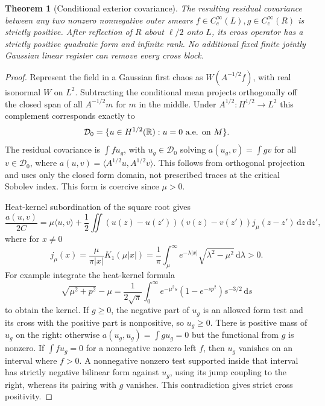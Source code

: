 \documentclass[11pt]{article}
\newtheorem{theorem}{Theorem}
\newcommand{\dd}{\mathrm d}
\begin{document}
\begin{theorem}[Conditional exterior covariance]
The resulting residual covariance between any two nonzero nonnegative outer smears \(f\in C_c^\infty(L),g\in C_c^\infty(R)\) is strictly positive. After reflection of \(R\) about \(\ell/2\) onto \(L\), its cross operator has a strictly positive quadratic form and infinite rank. No additional fixed finite jointly Gaussian linear register can remove every cross block.
\end{theorem}
\begin{proof}
Represent the field in a Gaussian first chaos as \(W(A^{-1/2}f)\), with real isonormal \(W\) on \(L^2\). Subtracting the conditional mean projects orthogonally off the closed span of all \(A^{-1/2}m\) for \(m\) in the middle. Under \(A^{1/2}:H^{1/2}\to L^2\) this complement corresponds exactly to
\[
 \mathcal D_0=\{u\in H^{1/2}(\mathbb R):u=0\ \hbox{a.e. on }M\}.
\]
The residual covariance is \(\int fu_g\), with \(u_g\in\mathcal D_0\) solving
\(a(u_g,v)=\int gv\) for all \(v\in\mathcal D_0\), where \(a(u,v)=\langle A^{1/2}u,A^{1/2}v\rangle\). This follows from orthogonal projection and uses only the closed form domain, not prescribed traces at the critical Sobolev index. This form is coercive since \(\mu>0\).

Heat-kernel subordination of the square root gives
\[
 \frac{a(u,v)}{2C}=\mu\langle u,v\rangle+
  \frac12\iint(u(z)-u(z'))(v(z)-v(z'))j_\mu(z-z')\,\dd z\,\dd z',
\]
where for \(x\ne0\)
\[
 j_\mu(x)=\frac{\mu}{\pi |x|}K_1(\mu|x|)
    =\frac1\pi\int_\mu^\infty e^{-\lambda |x|}
                           \sqrt{\lambda^2-\mu^2}\,\dd\lambda>0.
\]
For example integrate the heat-kernel formula
\[\sqrt{\mu^2+p^2}-\mu=\frac{1}{2\sqrt\pi}\int_0^\infty e^{-\mu^2s}(1-e^{-sp^2})s^{-3/2}\,\dd s\]
to obtain the kernel. If \(g\ge0\), the negative part of \(u_g\) is an allowed form test and its cross with the positive part is nonpositive, so \(u_g\ge0\). There is positive mass of \(u_g\) on the right: otherwise \(a(u_g,u_g)=\int gu_g=0\) but the functional from \(g\) is nonzero. If \(\int fu_g=0\) for a nonnegative nonzero left \(f\), then \(u_g\) vanishes on an interval where \(f>0\). A nonnegative nonzero test supported inside that interval has strictly negative bilinear form against \(u_g\), using its jump coupling to the right, whereas its pairing with \(g\) vanishes. This contradiction gives strict cross positivity.


\end{proof}
\end{document}

